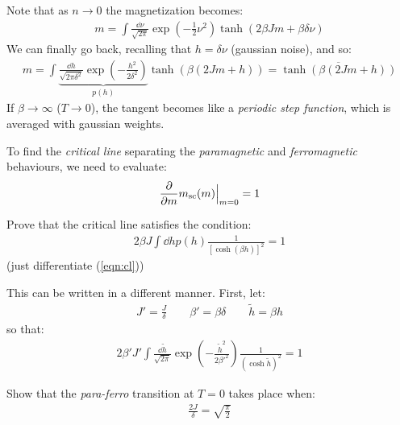 \documentclass[../template.tex]{subfiles}
\begin{document}
Note that as $n \to 0$ the magnetization becomes:
\begin{align*}
    m = \int \frac{\dd{\nu}}{\sqrt{2 \pi}} \exp\left(-\frac{1}{2}\nu^2 \right) \tanh (2 \beta J m + \beta \delta \nu) 
\end{align*}
We can finally go back, recalling that $h = \delta \nu$ (gaussian noise), and so:
\begin{align*}
    m = \int \underbrace{\frac{\dd{h}}{\sqrt{2\pi \delta^2}} \exp\left(-\frac{h^2}{2 \delta^2} \right)}_{p(h)}   \tanh( \beta (2 J m + h)) = \overline{\tanh(\beta(2 J m + h))}
\end{align*} 
If $\beta \to \infty$ ($T \to 0$), the tangent becomes like a \textit{periodic step function}, which is averaged with gaussian weights. 

To find the \textit{critical line} separating the \textit{paramagnetic} and \textit{ferromagnetic} behaviours, we need to evaluate:
\begin{align}
    \pdv{m} m_{\mathrm{sc} }(m) \Big|_{m=0} = 1
    \label{eqn:cl}
\end{align}   

\begin{exo}
    Prove that the critical line satisfies the condition:
    \begin{align*}
        2 \beta J \int \dd{h} p(h) \frac{1}{[\cosh (\beta h)]^2} = 1  
    \end{align*}
    (just differentiate (\ref{eqn:cl}))
\end{exo}

This can be written in a different manner. First, let:
\begin{align*}
    J' = \frac{J}{\delta} \qquad \beta' = \beta \delta \qquad \tilde{h} = \beta h 
\end{align*}
so that:
\begin{align*}
    2 \beta' J' \int \frac{\dd{\tilde{h}}}{\sqrt{2 \pi}} \exp(-\frac{\tilde{h}^2}{2 {\beta'}^2} ) \frac{1}{(\cosh \tilde{h})^2} = 1 
\end{align*}

\begin{exo}[Critical ratio at $T = 0$]
    Show that the \textit{para-ferro} transition at $T=0$ takes place when:
    \begin{align*}
        \frac{2J}{\delta} = \sqrt{\frac{\pi}{2}}  
    \end{align*}  
\end{exo}
\end{document}
